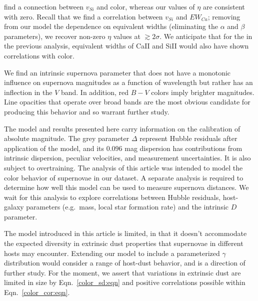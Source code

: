 \documentclass{aastex}   	%
\begin{document}
\citet{2009ApJ...699L.139W, 2011ApJ...729...55F} find a connection between $v_{Si}$ and color, whereas
our values of $\eta$ are consistent with zero.  Recall that we find a correlation between $v_{Si}$ and $EW_{Ca}$;
removing from our model the dependence on equivalent widths (eliminating the  $\alpha$ and $\beta$ parameters), we recover
non-zero $\eta$ values at  $\gtrsim 2\sigma$.  We  anticipate that for the in the previous analysis, equivalent widths of CaII and
SiII would also have shown correlations with color.


We find an intrinsic supernova parameter that does not have a monotonic influence on supernova magnitudes as a function
of wavelength but rather has an inflection in the $V$ band.  In addition, red $B-V$ colors imply brighter magnitudes.  Line opacities
that operate over broad bands are the most obvious candidate for producing this behavior and so warrant further study.


The model and results presented here
carry information on the calibration of absolute magnitude.  The grey parameter $\Delta$ represent Hubble residuals after
application of the model, and its  $0.096$ mag dispersion has contributions from intrinsic dispersion, peculiar velocities, and
measurement uncertainties.  It is also subject to overtraining.
The  analysis of this article was intended to model the color behavior of supernovae in our dataset.
A separate analysis is required to determine how
well this model can be used to measure supernova distances.
We wait for this analysis to explore correlations between Hubble residuals, host-galaxy parameters (e.g.\ mass,
local star formation rate) and the intrinsic $D$ parameter.

The model introduced in this article is limited, in that it doesn't accommodate the expected diversity
in extrinsic dust properties that supernovae in different hosts may encounter.  Extending our model to 
include  a parameterized  $\gamma$ distribution would consider a range of host-dust behavior, and
is a direction of further study.
For the moment, we assert that variations in extrinsic dust are limited in
size by Eqn.~\ref{color_sd:eqn} and positive correlations possible within Eqn.~\ref{color_cor:eqn}.

\acknowledgments



\end{document}
